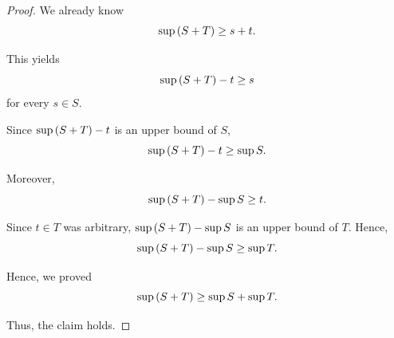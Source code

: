 \begin{proof}
We already know 
\begin{equation*}
    \sup \left(S + T\right) \geq s + t. 
\end{equation*}

This yields 
\begin{equation*}
    \sup \left(S + T \right) - t \geq s
\end{equation*}
for every $s \in S$.

Since $\sup \left(S + T \right) - t$ is an upper bound of $S$, 
\begin{equation*}
    \sup \left(S + T \right) - t \geq \sup S. 
\end{equation*}

Moreover, 
\begin{equation*}
    \sup \left(S + T \right) - \sup S \geq t. 
\end{equation*}

Since $t \in T$ was arbitrary, $\sup \left(S + T \right) - \sup S$ is an upper bound of $T$. Hence,
\begin{equation*}
    \sup \left(S + T \right) - \sup S \geq \sup T. 
\end{equation*}

Hence, we proved 
\begin{equation*}
    \sup \left(S + T \right) \geq \sup S + \sup T. 
\end{equation*}

Thus, the claim holds. 
\end{proof}

\newpage
